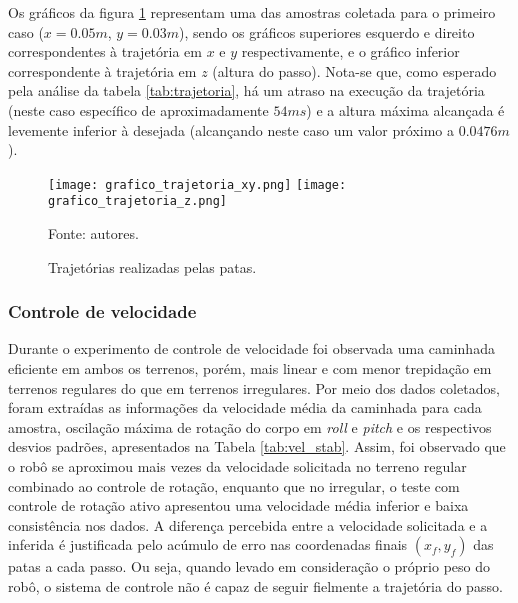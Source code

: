 \documentclass[../main.tex]{subfiles}
\begin{document}
  Os gráficos da figura \ref{fig:grafico_trajetoria_xyz} representam uma das amostras coletada para o primeiro caso ($x=0.05m$, $y=0.03m$), sendo os gráficos superiores esquerdo e direito correspondentes à trajetória em $x$ e $y$ respectivamente, e o gráfico inferior correspondente à trajetória em $z$ (altura do passo). Nota-se que, como esperado pela análise da tabela \ref{tab:trajetoria}, há um atraso na execução da trajetória (neste caso específico de aproximadamente $54ms$) e a altura máxima alcançada é levemente inferior à desejada (alcançando neste caso um valor próximo a $0.0476m$).

  \begin{figure}[!htb]
    \centering
    \caption{Trajetórias realizadas pelas patas.}
    \texttt{[image: grafico\_trajetoria\_xy.png]}
    \texttt{[image: grafico\_trajetoria\_z.png]}
    
    Fonte: autores.
    \label{fig:grafico_trajetoria_xyz}
  \end{figure}

  \subsubsection{Controle de velocidade}
  Durante o experimento de controle de velocidade foi observada uma caminhada eficiente em ambos os terrenos, porém, mais linear e com menor trepidação em terrenos regulares do que em terrenos irregulares. Por meio dos dados coletados, foram extraídas as informações da velocidade média da caminhada para cada amostra, oscilação máxima de rotação do corpo em \textit{roll} e \textit{pitch} e os respectivos desvios padrões, apresentados na Tabela \ref{tab:vel_stab}. Assim, foi observado que o robô se aproximou mais vezes da velocidade solicitada no terreno regular combinado ao controle de rotação, enquanto que no irregular, o teste com controle de rotação ativo apresentou uma velocidade média inferior e baixa consistência nos dados. A diferença percebida entre a velocidade solicitada e a inferida é justificada pelo acúmulo de erro nas coordenadas finais $(x_f, y_f)$ das patas a cada passo. Ou seja, quando levado em consideração o próprio peso do robô, o sistema de controle não é capaz de seguir fielmente a trajetória do passo.
\end{document}
